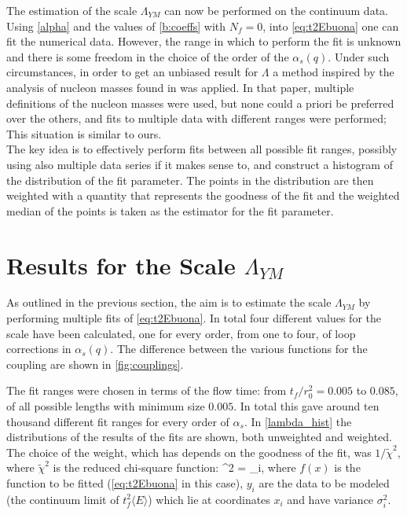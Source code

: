 The estimation of the scale $\Lambda_{YM}$ can now be performed on the continuum data. Using \cref{alpha} and the values of \cref{b:coeffs} with $N_f = 0$, into \cref{eq:t2Ebuona} one can fit the numerical data. However, the range in which to perform the fit is unknown and there is some freedom in the choice of the order of the $\alpha_s(q)$. Under such circumstances, in order to get an unbiased result for  $\Lambda$ a method inspired by the analysis of nucleon masses found in \cite{durr_ab-initio_2008-1}  was applied. In that paper, multiple definitions of the nucleon masses were used, but none could a priori be preferred over the others, and fits to multiple data with different ranges were performed; This situation is similar to ours.\\
The key idea is to effectively perform fits between all possible fit ranges, possibly using also multiple data series if it makes sense to, and construct a histogram of the distribution of the fit parameter. The points in the distribution are then weighted with a quantity that represents the goodness of the fit and the weighted median of the points is taken as the estimator for the fit parameter.

\section{Results for the Scale $\Lambda_{YM}$} 
As outlined in the previous section, the aim is to estimate the scale $\Lambda_{YM}$ by performing multiple fits of \cref{eq:t2Ebuona}. In total four different values for the scale have been calculated, one for every order, from one to four, of loop corrections in $\alpha_s(q)$. The difference between the various functions for the coupling are shown in \cref{fig:couplings}. 


The fit ranges were chosen in terms of the flow time: from $t_f/r_0^2 = 0.005$ to $0.085$, of all possible lengths with minimum size $0.005$. In total this gave around ten thousand different fit ranges for every order of $\alpha_s$. In \cref{lambda_hist} the distributions of the results of the fits are shown, both unweighted and weighted. The choice of the weight, which has depends on the goodness of the fit, was $1/\tilde\chi^2$, where $\tilde\chi^2$ is the reduced chi-square function:
\beq
\tilde\chi^2 =  \sum_i,
\eeq
where $f(x)$ is the function to be fitted (\cref{eq:t2Ebuona} in this case), $y_i$ are the data to be modeled (the continuum limit of $t_f^2\langle E\rangle$) which lie at coordinates $x_i$ and have variance $\sigma_i^2$. 

